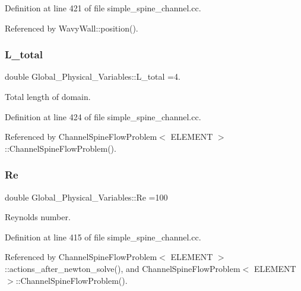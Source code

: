 Definition at line 421 of file simple\+\_\+spine\+\_\+channel.\+cc.



Referenced by Wavy\+Wall\+::position().

\mbox{\label{namespaceGlobal__Physical__Variables_a9ec945e33c27b1cfe2e4da7cf3a89f72}} 
\subsubsection{\texorpdfstring{L\+\_\+total}{L\_total}}
{\footnotesize\ttfamily double Global\+\_\+\+Physical\+\_\+\+Variables\+::\+L\+\_\+total =4.}



Total length of domain. 



Definition at line 424 of file simple\+\_\+spine\+\_\+channel.\+cc.



Referenced by Channel\+Spine\+Flow\+Problem$<$ E\+L\+E\+M\+E\+N\+T $>$\+::\+Channel\+Spine\+Flow\+Problem().

\mbox{\label{namespaceGlobal__Physical__Variables_ab814e627d2eb5bc50318879d19ab16b9}} 
\subsubsection{\texorpdfstring{Re}{Re}}
{\footnotesize\ttfamily double Global\+\_\+\+Physical\+\_\+\+Variables\+::\+Re =100}



Reynolds number. 



Definition at line 415 of file simple\+\_\+spine\+\_\+channel.\+cc.



Referenced by Channel\+Spine\+Flow\+Problem$<$ E\+L\+E\+M\+E\+N\+T $>$\+::actions\+\_\+after\+\_\+newton\+\_\+solve(), and Channel\+Spine\+Flow\+Problem$<$ E\+L\+E\+M\+E\+N\+T $>$\+::\+Channel\+Spine\+Flow\+Problem().

